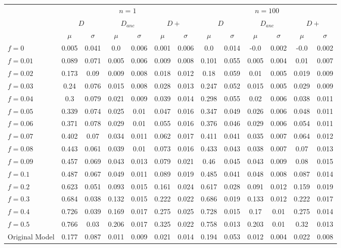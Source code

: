 \begin{tabular}{@{}lcccccccccccc@{}}
\toprule
 & \multicolumn{6}{c}{$n=1$} & \multicolumn{6}{c}{$n=100$} \\
\cmidrule(lr){2-7} \cmidrule(lr){8-13}
 & \multicolumn{2}{c}{$D$} & \multicolumn{2}{c}{$D_{anc}$} & \multicolumn{2}{c}{$D+$} & \multicolumn{2}{c}{$D$} & \multicolumn{2}{c}{$D_{anc}$} & \multicolumn{2}{c}{$D+$} \\
\cmidrule(lr){2-3} \cmidrule(lr){4-5} \cmidrule(lr){6-7} \cmidrule(lr){8-9} \cmidrule(lr){10-11} \cmidrule(lr){12-13}
 & $\mu$ & $\sigma$ & $\mu$ & $\sigma$ & $\mu$ & $\sigma$ & $\mu$ & $\sigma$ & $\mu$ & $\sigma$ & $\mu$ & $\sigma$ \\
\midrule
$f = 0$ & 0.005 & 0.041 & 0.0 & 0.006 & 0.001 & 0.006 & 0.0 & 0.014 & -0.0 & 0.002 & -0.0 & 0.002 \\
$f = 0.01$ & 0.089 & 0.071 & 0.005 & 0.006 & 0.009 & 0.008 & 0.101 & 0.055 & 0.005 & 0.004 & 0.01 & 0.007 \\
$f = 0.02$ & 0.173 & 0.09 & 0.009 & 0.008 & 0.018 & 0.012 & 0.18 & 0.059 & 0.01 & 0.005 & 0.019 & 0.009 \\
$f = 0.03$ & 0.24 & 0.076 & 0.015 & 0.008 & 0.028 & 0.013 & 0.247 & 0.052 & 0.015 & 0.005 & 0.029 & 0.009 \\
$f = 0.04$ & 0.3 & 0.079 & 0.021 & 0.009 & 0.039 & 0.014 & 0.298 & 0.055 & 0.02 & 0.006 & 0.038 & 0.011 \\
$f = 0.05$ & 0.339 & 0.074 & 0.025 & 0.01 & 0.047 & 0.016 & 0.347 & 0.049 & 0.026 & 0.006 & 0.048 & 0.011 \\
$f = 0.06$ & 0.371 & 0.078 & 0.029 & 0.01 & 0.055 & 0.016 & 0.376 & 0.046 & 0.029 & 0.006 & 0.054 & 0.011 \\
$f = 0.07$ & 0.402 & 0.07 & 0.034 & 0.011 & 0.062 & 0.017 & 0.411 & 0.041 & 0.035 & 0.007 & 0.064 & 0.012 \\
$f = 0.08$ & 0.443 & 0.061 & 0.039 & 0.01 & 0.073 & 0.016 & 0.433 & 0.043 & 0.038 & 0.007 & 0.07 & 0.013 \\
$f = 0.09$ & 0.457 & 0.069 & 0.043 & 0.013 & 0.079 & 0.021 & 0.46 & 0.045 & 0.043 & 0.009 & 0.08 & 0.015 \\
$f = 0.1$ & 0.487 & 0.067 & 0.049 & 0.011 & 0.089 & 0.019 & 0.485 & 0.041 & 0.048 & 0.008 & 0.087 & 0.014 \\
$f = 0.2$ & 0.623 & 0.051 & 0.093 & 0.015 & 0.161 & 0.024 & 0.617 & 0.028 & 0.091 & 0.012 & 0.159 & 0.019 \\
$f = 0.3$ & 0.684 & 0.038 & 0.132 & 0.015 & 0.222 & 0.022 & 0.686 & 0.019 & 0.133 & 0.012 & 0.222 & 0.017 \\
$f = 0.4$ & 0.726 & 0.039 & 0.169 & 0.017 & 0.275 & 0.025 & 0.728 & 0.015 & 0.17 & 0.01 & 0.275 & 0.014 \\
$f = 0.5$ & 0.766 & 0.03 & 0.206 & 0.017 & 0.325 & 0.022 & 0.758 & 0.013 & 0.203 & 0.01 & 0.32 & 0.013 \\
Original Model & 0.177 & 0.087 & 0.011 & 0.009 & 0.021 & 0.014 & 0.194 & 0.053 & 0.012 & 0.004 & 0.022 & 0.008 \\
\bottomrule
\end{tabular}
